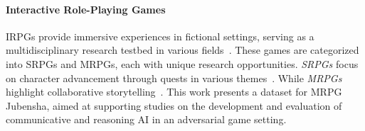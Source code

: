 \documentclass[11pt]{article}
\begin{document}
\paragraph{Interactive Role-Playing Games}
IRPGs provide immersive experiences in fictional settings, serving as a multidisciplinary research testbed in various fields~\cite{zagal2018definitions, barreteau2003role,nagata-etal-2021-shared}. These games are categorized into SRPGs and MRPGs, each with unique research opportunities.
\textit{SRPGs} focus on character advancement through quests in various themes~\cite{IFDB, cote2019textworld, szot2021habitat, fan2022minedojo, shridhar2020alfworld, wang2022scienceworld}. While \textit{MRPGs} highlight collaborative storytelling~\cite{lai2023werewolf, park2023generative, fu2023improving,kramar2022negotiation, meta2022human}. This work presents a dataset for MRPG Jubensha, aimed at supporting studies on the development and evaluation of communicative and reasoning AI in an adversarial game setting.




\end{document}
